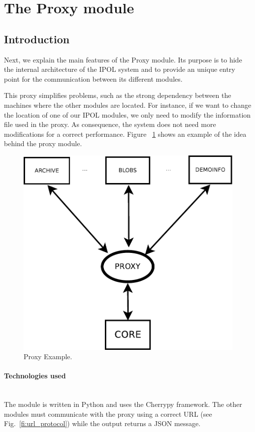 \section{The Proxy module}

\subsection{Introduction}
\label{sec:proxy_introduction}

Next, we explain the main features of the Proxy module. Its purpose is to hide the internal architecture of the IPOL system and to provide an unique entry point for the communication between its different modules. 

This proxy simplifies problems, such as the strong dependency between the machines where the other modules are located. For instance, if we want to change the location of one of our IPOL modules, we only need to modify the information file used in the proxy. As consequence, the system does not need more modifications for a correct performance. Figure ~\ref{fi:proxy_example} shows an example of the idea behind the proxy module.

\begin{figure}[!ht]
\centering
\includegraphics[width=0.5\columnwidth]{proxy/images/proxy_diagram.pdf}
\caption{Proxy Example.} 
\label{fi:proxy_example}
\end{figure}

\paragraph{Technologies used} \hspace{0pt} \\
The module is written in Python and uses the Cherrypy framework. The other modules must communicate with the proxy using a correct URL (see Fig.~\ref{fi:url_protocol}) while the output returns a JSON message.

